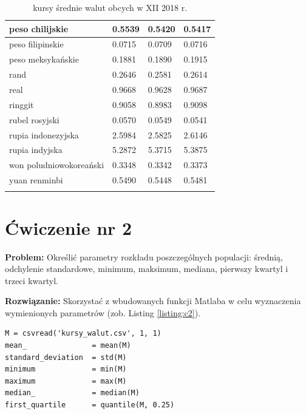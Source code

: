 \documentclass[12pt, a4paper]{article}
\begin{document}
\begin{longtable}{|l|l|l|l|}
  peso chilijskie         & 0.5539 & 0.5420 & 0.5417 \\\hline 
  peso filipinskie        & 0.0715 & 0.0709 & 0.0716 \\\hline 
  peso meksykańskie       & 0.1881 & 0.1890 & 0.1915 \\\hline 
  rand                    & 0.2646 & 0.2581 & 0.2614 \\\hline 
  real                    & 0.9668 & 0.9628 & 0.9687 \\\hline 
  ringgit                 & 0.9058 & 0.8983 & 0.9098 \\\hline 
  rubel rosyjski          & 0.0570 & 0.0549 & 0.0541 \\\hline 
  rupia indonezyjska      & 2.5984 & 2.5825 & 2.6146 \\\hline 
  rupia indyjska          & 5.2872 & 5.3715 & 5.3875 \\\hline 
  won poludniowokoreański & 0.3348 & 0.3342 & 0.3373 \\\hline 
  yuan renminbi           & 0.5490 & 0.5448 & 0.5481 \\\hline
  \caption{kursy średnie walut obcych w XII 2018 r.}
  \label{table:nbp}
\end{longtable}

\section*{Ćwiczenie nr 2}

\begin{hangparas}{2.1cm}{1}
  \textbf{Problem:} Określić parametry rozkładu poszczególnych populacji: średnią, odchylenie standardowe, minimum, maksimum, mediana, pierwszy kwartyl i trzeci kwartyl.\newline
\end{hangparas}

\begin{hangparas}{2.85cm}{1}
\textbf{Rozwiązanie:} Skorzystać z wbudowanych funkcji Matlaba w celu wyznaczenia wymienionych parametrów (zob. Listing \ref{listing:c2}).\newline
\end{hangparas}
\begin{lstlisting}[frame=single,label={listing:c2},caption={fragment rozwiązania ćwiczenia nr 2.},captionpos=b]
M = csvread('kursy_walut.csv', 1, 1)
mean_               = mean(M)
standard_deviation  = std(M)
minimum             = min(M)
maximum             = max(M)
median_             = median(M)
first_quartile      = quantile(M, 0.25)
\end{lstlisting}
\end{document}
